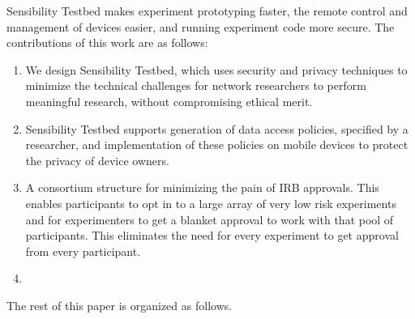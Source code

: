 Sensibility Testbed makes experiment
prototyping faster, the remote control and management of devices
easier, and running experiment code more secure. The
contributions of this work are as follows:

\begin{enumerate}
\item We design Sensibility Testbed, which uses security and 
privacy techniques to minimize the technical challenges for 
network researchers to perform meaningful research, without 
compromising ethical merit.

\item Sensibility Testbed supports generation of data access 
policies, specified by a researcher, and implementation of 
these policies on mobile devices to protect the privacy of 
device owners.

\item A consortium structure for minimizing the pain of IRB 
approvals.  This enables participants to opt in to a large 
array of very low risk experiments and for experimenters to 
get a blanket approval to work with that pool of participants.  
This eliminates the need for every experiment to get approval 
from every participant.

\item {}
\end{enumerate}

The rest of this paper is organized as follows. 